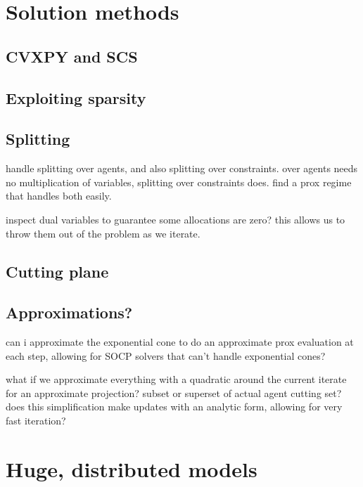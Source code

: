 \documentclass{article}
\begin{document}
\section{Solution methods}

\subsection{CVXPY and SCS}
\subsection{Exploiting sparsity}
\subsection{Splitting}
handle splitting over agents, and also splitting over constraints. over agents needs no multiplication of variables, splitting over constraints does. find a prox regime that handles both easily.

inspect dual variables to guarantee some allocations are zero? this allows us to throw them out of the problem as we iterate.

\subsection{Cutting plane}
\subsection{Approximations?}
can i approximate the exponential cone to do an approximate prox evaluation
at each step, allowing for SOCP solvers that can't handle exponential cones?

what if we approximate everything with a quadratic around the current iterate for an approximate projection? subset or superset of actual agent cutting set? does this simplification make updates with an analytic form, allowing for very fast iteration?

\section{Huge, distributed models}

\newpage


\end{document}
